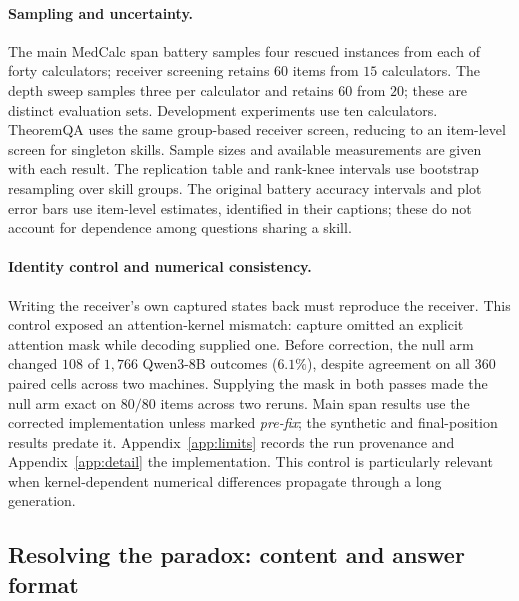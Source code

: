 \documentclass{article}
\begin{document}
\paragraph{Sampling and uncertainty.}
The main MedCalc span battery samples four rescued instances from each of forty
calculators; receiver screening retains $60$ items from $15$ calculators.
The depth sweep samples three per calculator and retains $60$ from $20$;
these are distinct evaluation sets. Development experiments use ten calculators.
TheoremQA uses the same group-based receiver screen, reducing to an item-level
screen for singleton skills. Sample sizes and available measurements are given
with each result. The replication table and rank-knee intervals use bootstrap
resampling over skill groups. The original battery accuracy intervals and plot
error bars use item-level estimates, identified in their captions; these do not
account for dependence among questions sharing a skill.

\paragraph{Identity control and numerical consistency.}
Writing the receiver's own captured states back must reproduce the receiver.
This control exposed an attention-kernel mismatch: capture omitted an explicit
attention mask while decoding supplied one. Before correction, the null arm
changed $108$ of $1{,}766$ Qwen3-8B outcomes ($6.1\%$), despite agreement on all
$360$ paired cells across two machines. Supplying the mask in both passes made
the null arm exact on $80/80$ items across two reruns. Main span results use the
corrected implementation unless marked \emph{pre-fix}; the synthetic and
final-position results predate it. Appendix~\ref{app:limits} records the run
provenance and Appendix~\ref{app:detail} the implementation. This control is
particularly relevant when kernel-dependent numerical differences
\citep{he2025nondeterminism} propagate through a long generation.

\subsection{Resolving the paradox: content and answer format}
\label{sec:decomp}
\end{document}
